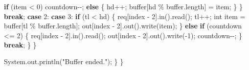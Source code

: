 \documentclass[11pt]{article}
\newenvironment{Shaded}{}{}
\newcommand{\DataTypeTok}[1]{\textcolor[rgb]{0.56,0.13,0.00}{{#1}}}
\newcommand{\DecValTok}[1]{\textcolor[rgb]{0.25,0.63,0.44}{{#1}}}
\newcommand{\StringTok}[1]{\textcolor[rgb]{0.25,0.44,0.63}{{#1}}}
\newcommand{\FunctionTok}[1]{\textcolor[rgb]{0.02,0.16,0.49}{{#1}}}
\newcommand{\NormalTok}[1]{{#1}}
\newcommand{\ControlFlowTok}[1]{\textcolor[rgb]{0.00,0.44,0.13}{\textbf{{#1}}}}
\newcommand{\OperatorTok}[1]{\textcolor[rgb]{0.40,0.40,0.40}{{#1}}}
\newcommand{\BuiltInTok}[1]{{#1}}
\begin{document}
\begin{Shaded}
\begin{Highlighting}[]
                        \ControlFlowTok{if} \OperatorTok{(}\NormalTok{item }\OperatorTok{\textless{}} \DecValTok{0}\OperatorTok{)}
\NormalTok{                            countdown}\OperatorTok{{-}{-};}
                        \ControlFlowTok{else} \OperatorTok{\{}
\NormalTok{                            hd}\OperatorTok{++;}
\NormalTok{                            buffer}\OperatorTok{[}\NormalTok{hd }\OperatorTok{\%}\NormalTok{ buffer}\OperatorTok{.}\FunctionTok{length}\OperatorTok{]} \OperatorTok{=}\NormalTok{ item}\OperatorTok{;}
                        \OperatorTok{\}}
                    \OperatorTok{\}}
                    \ControlFlowTok{break}\OperatorTok{;}
                \ControlFlowTok{case} \DecValTok{2}\OperatorTok{:}
                \ControlFlowTok{case} \DecValTok{3}\OperatorTok{:}
                    \ControlFlowTok{if} \OperatorTok{(}\NormalTok{tl }\OperatorTok{\textless{}}\NormalTok{ hd}\OperatorTok{)} \OperatorTok{\{}
\NormalTok{                        req}\OperatorTok{[}\NormalTok{index }\OperatorTok{{-}} \DecValTok{2}\OperatorTok{].}\FunctionTok{in}\OperatorTok{().}\FunctionTok{read}\OperatorTok{();}
\NormalTok{                        tl}\OperatorTok{++;}
                        \DataTypeTok{int}\NormalTok{ item }\OperatorTok{=}\NormalTok{ buffer}\OperatorTok{[}\NormalTok{tl }\OperatorTok{\%}\NormalTok{ buffer}\OperatorTok{.}\FunctionTok{length}\OperatorTok{];}
\NormalTok{                        out}\OperatorTok{[}\NormalTok{index }\OperatorTok{{-}} \DecValTok{2}\OperatorTok{].}\FunctionTok{out}\OperatorTok{().}\FunctionTok{write}\OperatorTok{(}\NormalTok{item}\OperatorTok{);}
                    \OperatorTok{\}} \ControlFlowTok{else} \ControlFlowTok{if} \OperatorTok{(}\NormalTok{countdown }\OperatorTok{\textless{}=} \DecValTok{2}\OperatorTok{)} \OperatorTok{\{}
\NormalTok{                        req}\OperatorTok{[}\NormalTok{index }\OperatorTok{{-}} \DecValTok{2}\OperatorTok{].}\FunctionTok{in}\OperatorTok{().}\FunctionTok{read}\OperatorTok{();}
\NormalTok{                        out}\OperatorTok{[}\NormalTok{index }\OperatorTok{{-}} \DecValTok{2}\OperatorTok{].}\FunctionTok{out}\OperatorTok{().}\FunctionTok{write}\OperatorTok{({-}}\DecValTok{1}\OperatorTok{);}
\NormalTok{                        countdown}\OperatorTok{{-}{-};}
                    \OperatorTok{\}}
                    \ControlFlowTok{break}\OperatorTok{;}
            \OperatorTok{\}}
        \OperatorTok{\}}

        \BuiltInTok{System}\OperatorTok{.}\FunctionTok{out}\OperatorTok{.}\FunctionTok{println}\OperatorTok{(}\StringTok{"Buffer ended."}\OperatorTok{);}
    \OperatorTok{\}}
\OperatorTok{\}}
\end{Highlighting}
\end{Shaded}
\end{document}
